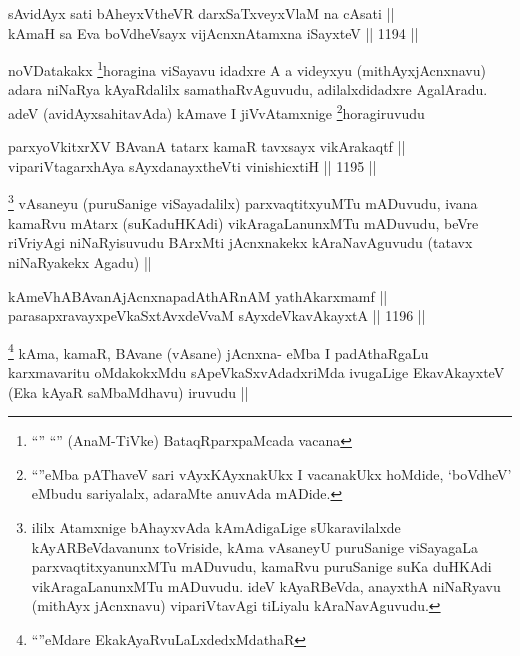 \begin{shl}
sA\s vidAyx sati bAheyxV\s theVR darxSaTxveyxV\s laM na cAsati || \\
kAmaH sa Eva boVdheV\s sayx vijAcnxnAtamxna iSayxteV ||  1194 ||  
\end{shl}

\begin{artha}
noVDatakakx \footnote{``\stext'' ``\stext'' (AnaM-TiVke) BataqRparxpaMcada vacana}horagina viSayavu idadxre A a videyxyu (mithAyxjAcnxnavu) adara niNaRya kAyaRdalilx samathaRvAguvudu, adilalxdidadxre AgalAradu. adeV (avidAyxsahitavAda) kAmave I jiVvAtamxnige \footnote{``\stext''eMba pAThaveV sari vAyxKAyxnakUkx I vacanakUkx hoMdide, `boVdheV' eMbudu sariyalalx, adaraMte anuvAda mADide.}horagiruvudu
\end{artha}

\begin{shl}
parxyoVkitxrXV BAvanA tatarx kamaR tavxsayx vikArakaqtf || \\
vipariVtagarxhAya sAyxdanayxtheVti vinishicxtiH ||  1195 ||  
\end{shl}

\begin{artha}
\footnote{ililx Atamxnige bAhayxvAda kAmAdigaLige sUkaravilalxde kAyARBeVdavanunx toVriside, kAma vAsaneyU puruSanige viSayagaLa parxvaqtitxyanunxMTu mADuvudu, kamaRvu puruSanige suKa duHKAdi vikAragaLanunxMTu mADuvudu. ideV kAyaRBeVda, anayxthA niNaRyavu (mithAyx jAcnxnavu) vipariVtavAgi tiLiyalu kAraNavAguvudu.}
vAsaneyu (puruSanige viSayadalilx) parxvaqtitxyuMTu mADuvudu, ivana kamaRvu mAtarx (suKaduHKAdi) vikAragaLanunxMTu mADuvudu, beVre riVriyAgi niNaRyisuvudu BArxMti jAcnxnakekx kAraNavAguvudu (tatavx niNaRyakekx Agadu) ||
\end{artha}


\begin{shl}
kAmeVhABAvanAjAcnxnapadAthARnAM yathAkarxmamf || \\
parasapxravayxpeVkaSxtAvxdeVvaM sAyxdeVkavAkayxtA ||  1196 ||  
\end{shl}

\begin{artha}
\footnote{``\stext''eMdare EkakAyaRvuLaLxdedxMdathaR}
kAma, kamaR, BAvane (vAsane) jAcnxna- eMba I padAthaRgaLu karxmavaritu oMdakokxMdu sApeVkaSxvAdadxriMda ivugaLige EkavAkayxteV (Eka kAyaR saMbaMdhavu) iruvudu ||
\end{artha}

